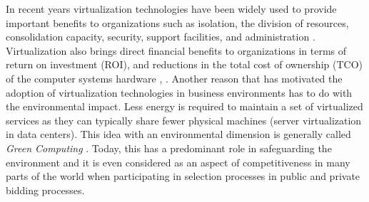 	
	In recent years virtualization technologies have been widely used to provide important benefits to organizations such as isolation, the division of resources, consolidation capacity, security, support facilities, and administration \cite{Varasteh2017}.
	Virtualization also brings direct financial benefits to organizations in terms of return on investment (ROI), and reductions in the total cost of ownership (TCO) of the computer systems hardware \cite{Solis2014}, \cite{AbdElRahem2016}. Another reason that has motivated the adoption of virtualization technologies in business environments has to do with the environmental impact. 
	Less energy is required to maintain a set of virtualized services as they can typically share fewer physical machines (server virtualization in data centers). This idea with an environmental dimension is generally called \textit{Green Computing} \cite {Thathera2015, Ranjith2017, Jing2011}. Today, this has a predominant role in safeguarding the environment and it is even considered as an aspect of competitiveness in many parts of the world when participating in selection processes in public and private bidding processes.
	
	 
	
	

